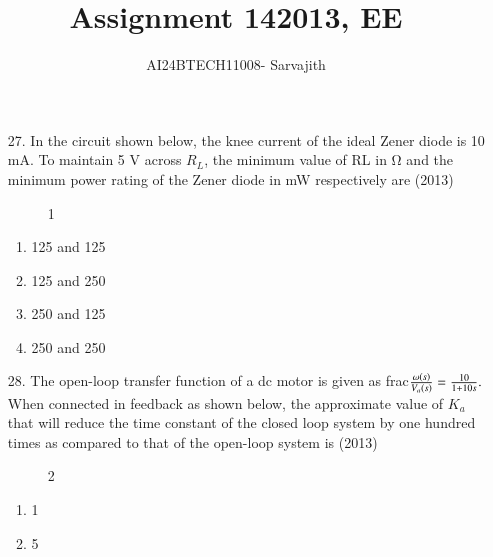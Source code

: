 \documentclass[journal]{IEEEtran}
\begin{document}

\vspace{3cm}


\author{AI24BTECH11008- Sarvajith
}
\title{Assignment 14}
{\let\newpage\relax\maketitle}
\title{2013, EE}
\renewcommand{\thefigure}{\theenumi}
\renewcommand{\thetable}{\theenumi}
\setlength{\intextsep}{10pt} %
\renewcommand{\thetable}{\theenumi}
\begin{enumerate}
    \item[27.] In the circuit shown below, the knee current of the ideal Zener diode is 10 mA. To maintain 5 V
    across $R_L$, the minimum value of RL in Ω and the minimum power rating of the Zener diode in mW
    respectively are \hfill (2013)
    \begin{figure}[!ht]
        \centering
        \caption{1}
    \end{figure}
    \begin{enumerate}[label=(\Alph*)]
        \item 125 and 125
        \item 125 and 250
        \item 250 and 125
        \item 250 and 250
    \end{enumerate}
    \item[28.] The open-loop transfer function of a dc motor is given as frac$\frac{\omega\left(s\right)}{V_a\left(s\right)} = \frac{10}{1+10s}.$ When connected in
    feedback as shown below, the approximate value of $K_a$ that will reduce the time constant of the
    closed loop system by one hundred times as compared to that of the open-loop system is \hfill (2013)
    \begin{figure}[!ht]
        \centering
        \caption{2}
    \end{figure}
    \begin{enumerate}[label=(\Alph*)]
        \item 1
        \item 5

\end{enumerate}
\end{enumerate}
\end{document}
